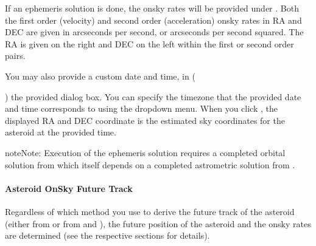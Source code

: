 \documentclass[letterpaper,11pt,english]{sphinxmanual}
\begin{document}
\sphinxAtStartPar
If an ephemeris solution is done, the on\sphinxhyphen{}sky rates will be provided under
. Both the first order (velocity) and
second order (acceleration) on\sphinxhyphen{}sky rates in RA and DEC are given in arcseconds
per second, or arcseconds per second squared. The RA is given on the right and
DEC on the left within the first or second order pairs.

\sphinxAtStartPar
You may also provide a custom date and time, in
(%
\begin{footnote}[8]\sphinxAtStartFootnote
{}
%
\end{footnote}) the
provided dialog box. You can specify the timezone that the provided date and
time corresponds to using the dropdown menu. When you click
, the displayed RA and DEC coordinate is the estimated
sky coordinates for the asteroid at the provided time.

\begin{sphinxadmonition}{note}{Note:}
\sphinxAtStartPar
Execution of the ephemeris solution requires a completed orbital
solution from {\hyperref[\detokenize{user/manual_mode:user-manual-mode-procedure-orbital-elements}]{}} which
itself depends on a completed astrometric solution from
{\hyperref[\detokenize{user/manual_mode:user-manual-mode-procedure-find-asteroid-location-compute-astrometric-solution}]{}}.
\end{sphinxadmonition}


\paragraph{Asteroid On\sphinxhyphen{}Sky Future Track}
\label{\detokenize{user/manual_mode:asteroid-on-sky-future-track}}\label{\detokenize{user/manual_mode:user-manual-procedure-asteroid-on-sky-future-track}}
\sphinxAtStartPar
Regardless of which method you use to derive the future track of the asteroid
(either from {\hyperref[\detokenize{user/manual_mode:user-manual-mode-procedure-asteroid-position-propagation}]{}} or
from {\hyperref[\detokenize{user/manual_mode:user-manual-mode-procedure-orbital-elements}]{}} and
{\hyperref[\detokenize{user/manual_mode:user-manual-mode-procedure-ephemeris}]{}}), the future position of the
asteroid and the on\sphinxhyphen{}sky rates are determined (see the respective sections
for details).
\end{document}
